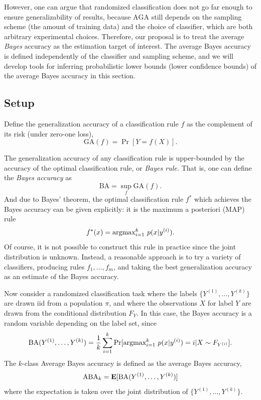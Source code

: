 However, one can argue that randomized classification does not go far
enough to ensure generalizability of results, because $\text{AGA}$
still depends on the sampling scheme (the amount of training data) and
the choice of classifier, which are both arbitrary experimental
choices.  Therefore, our proposal is to treat the average \emph{Bayes}
accuracy as the estimation target of interest.  The average Bayes
accuracy is defined independently of the classifier and sampling
scheme, and we will develop tools for inferring probabilistic lower
bounds (lower confidence bounds) of the average Bayes accuracy in this
section.

\subsection{Setup}


Define the generalization accuracy of a classification rule $f$ as the complement
of its risk (under zero-one loss),
\[
\text{GA}(f) = \Pr[Y = f(X)].
\]

The generalization accuracy of any classification rule is
upper-bounded by the accuracy of the optimal classification rule, or
\emph{Bayes rule.}  That is, one can define the \emph{Bayes accuracy}
as
\[
\text{BA} = \sup_f \text{GA}(f).
\]
And due to Bayes' theorem, the optimal classification rule $f^*$ which
achieves the Bayes accuracy can be given explicitly: it is the maximum a
posteriori (MAP) rule
\[
f^*(x) = \text{argmax}_{i=1}^k\ p(x|y^{(i)}).
\]
Of course, it is not possible to construct this rule in practice since
the joint distribution is unknown.  Instead, a reasonable approach is
to try a variety of classifiers, producing rules $f_1,\hdots, f_m$,
and taking the best generalization accuracy as an estimate of the Bayes
accuracy. 

Now consider a randomized classification task where the labels
$\{Y^{(1)},\hdots, Y^{(k)}\}$ are drawn iid from a population $\pi$,
and where the observations $X$ for label $Y$ are drawn from the
conditional distribution $F_Y$.  In this case, the Bayes accuracy is a
random variable depending on the label set, since
\[
\text{BA}(Y^{(1)},\hdots, Y^{(k)}) = \frac{1}{k} \sum_{i=1}^k \Pr[\text{argmax}_{i=1}^k\ p(x|y^{(i)}) = i| X \sim F_{Y^{(i)}}].
\]
The $k$-class Average Bayes accuracy is defined as the average Bayes accuracy,
\[
\text{ABA}_k = \textbf{E}[\text{BA}(Y^{(1)},\hdots, Y^{(k)})]
\]
where the expectation is taken over the joint distribution of $\{Y^{(1)},\hdots, Y^{(k)}\}$.

